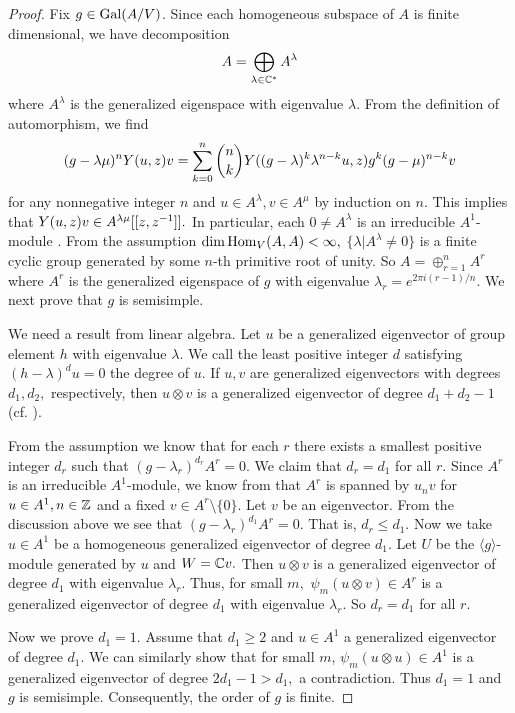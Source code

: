 \documentclass{amsart}
\begin{document}
\begin{proof} Fix $g\in {\rm Gal}(A/V)$. Since
each homogeneous subspace of $A$ is finite dimensional, we have decomposition
$$A=\bigoplus_{\lambda\in \mathbb{C}^*} A^{\lambda}$$
where $A^\lambda$ is the generalized eigenspace with eigenvalue $\lambda.$
From the definition of automorphism, we find
$$
(g-\lambda \mu)^n Y(u,z)v= \sum_{k=0}^n \binom{n}{k} Y((g-\lambda)^k \lambda^{n-k} u,z)g^k(g-\mu)^{n-k} v
$$
for any nonnegative integer $n$ and $u\in A^{\lambda}, v\in A^{\mu}$ by induction on $n$. 
This implies
that $Y(u,z)v\in A^{\lambda\mu}[[z,z^{-1}]].$ 
In particular, each 
$0\ne A^{\lambda}$ is an irreducible $A^1$-module \cite{DM1997}. From the assumption
$\dim\operatorname{Hom}_V(A,A)<\infty,$
$\{\lambda|A^{\lambda}\ne 0\}$ is a finite cyclic group generated by some $n$-th primitive root of unity. So
$A=\oplus_{r=1}^{n}A^r$ where $A^r$ is the generalized eigenspace of $g$ with eigenvalue $\lambda_r=e^{2\pi i(r-1)/n}.$ We next prove that $g$ is semisimple.

We need a result from linear algebra. Let $u$ be a generalized eigenvector of group element $h$ with eigenvalue $\lambda.$ We call the least positive integer $d$ satisfying $(h-\lambda)^du=0$ the degree of $u.$ If $u,v$ are generalized eigenvectors with degrees $d_1,d_2,$ respectively, then $u\otimes v$ is a generalized eigenvector of degree $d_1+d_2-1$ (cf. \cite{horn2012matrix}).

From the assumption we know that for each $r$ there exists a smallest positive integer $d_r$ such that $(g-\lambda_r)^{d_r}A^r=0.$ We claim that $d_r=d_1$ for all $r.$ Since $A^r$ is an irreducible $A^1$-module,
we know from \cite{DM1997} that $A^r$ is spanned by $u_nv$ for
$u\in A^1, n\in \mathbb{Z}$ and a fixed  $v\in A^r\setminus\{0\}$. Let $v$ be an eigenvector. From the discussion above 
we see that $(g-\lambda_r)^{d_1}A^{r}=0$. That is, $d_r\leq d_1.$  Now we take $u\in A^1$ be a homogeneous generalized eigenvector of degree $d_1.$ Let $U$ be 
the $\langle g\rangle$-module generated by $u$ and $W=\mathbb{C} v.$
Then $u\otimes v$ is a generalized eigenvector of degree $d_1$ with eigenvalue $\lambda_r.$  Thus, for small $m,$  $\psi_m(u\otimes v)\in A^r$ is a generalized eigenvector of degree $d_1$ with eigenvalue 
$\lambda_r.$ So $d_r=d_1$ for all $r.$

Now we prove $d_1=1.$  Assume that $d_1\geq 2$ and  $u\in A^1$  a generalized eigenvector of degree $d_1$.  We can similarly show that for small $m$,
$\psi_m(u\otimes u)\in A^1$ is a generalized eigenvector of degree $2d_1-1>d_1,$ a contradiction.
Thus $d_1=1$ and $g$ is semisimple. Consequently, the order of $g$ is finite.


\end{proof}
\end{document}
